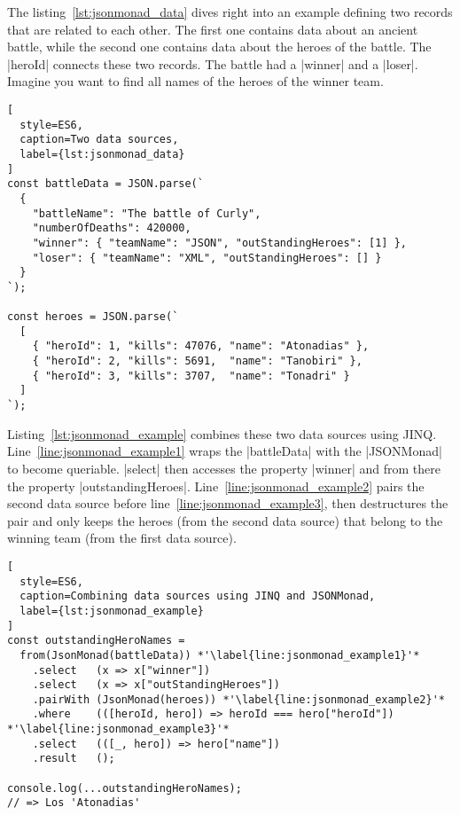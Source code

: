 The listing~\ref{lst:jsonmonad_data} dives right into an example defining two
records that are related to each other. The first one contains data about an
ancient battle, while the second one contains data about the heroes of the
battle. The |heroId| connects these two records. The battle had a |winner| and
a |loser|. Imagine you want to find all names of the heroes of the winner team.

\begin{lstlisting}[
  style=ES6,
  caption=Two data sources,
  label={lst:jsonmonad_data}
]
const battleData = JSON.parse(`
  {
    "battleName": "The battle of Curly",
    "numberOfDeaths": 420000,
    "winner": { "teamName": "JSON", "outStandingHeroes": [1] },
    "loser": { "teamName": "XML", "outStandingHeroes": [] }
  }
`);

const heroes = JSON.parse(`
  [
    { "heroId": 1, "kills": 47076, "name": "Atonadias" },
    { "heroId": 2, "kills": 5691,  "name": "Tanobiri" },
    { "heroId": 3, "kills": 3707,  "name": "Tonadri" }
  ]
`);
\end{lstlisting}

Listing~\ref{lst:jsonmonad_example} combines these two data sources using JINQ.
Line~\ref{line:jsonmonad_example1} wraps the |battleData| with the |JSONMonad|
to become queriable. |select| then accesses the property |winner| and from
there the property |outstandingHeroes|. Line~\ref{line:jsonmonad_example2}
pairs the second data source before line~\ref{line:jsonmonad_example3}, then
destructures the pair and only keeps the heroes (from the second data source)
that belong to the winning team (from the first data source).

\begin{lstlisting}[
  style=ES6,
  caption=Combining data sources using JINQ and JSONMonad,
  label={lst:jsonmonad_example}
]
const outstandingHeroNames =
  from(JsonMonad(battleData)) *'\label{line:jsonmonad_example1}'*
    .select   (x => x["winner"])
    .select   (x => x["outStandingHeroes"])
    .pairWith (JsonMonad(heroes)) *'\label{line:jsonmonad_example2}'*
    .where    (([heroId, hero]) => heroId === hero["heroId"]) *'\label{line:jsonmonad_example3}'*
    .select   (([_, hero]) => hero["name"])
    .result   ();

console.log(...outstandingHeroNames);
// => Los 'Atonadias'
\end{lstlisting}

